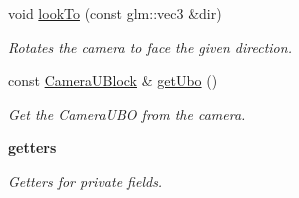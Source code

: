 \begin{DoxyCompactItemize}
void \hyperlink{classblaze_1_1Camera_a5820403405615c8af6a7e7d198ea0e5d}{look\+To} (const glm\+::vec3 \&dir)
\begin{DoxyCompactList}\small\item\em Rotates the camera to face the given direction. \end{DoxyCompactList}\item 
const \hyperlink{structblaze_1_1CameraUBlock}{Camera\+U\+Block} \& \hyperlink{classblaze_1_1Camera_a1eb1a0c7d84b4c0dcb4fdf778d183414}{get\+Ubo} ()
\begin{DoxyCompactList}\small\item\em Get the Camera\+U\+BO from the camera. \end{DoxyCompactList}\end{DoxyCompactItemize}
\begin{Indent}\textbf{ getters}\par
{\em Getters for private fields.

}
\end{Indent}
